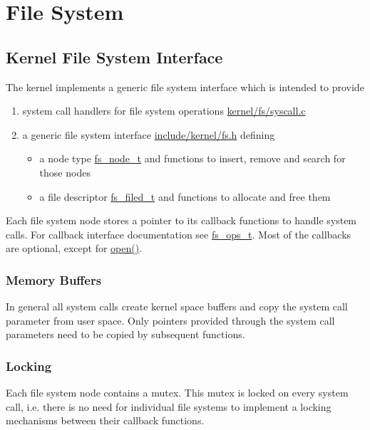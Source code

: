 %
%
%



\section{File System}
	\subsection{Kernel File System Interface}
		The kernel implements a generic file system interface which is intended to provide
		\begin{enumerate}
			\item system call handlers for file system operations \hyperref[kernel_2fs_2syscall_8c]{kernel/fs/syscall.c}
			\item a generic file system interface \hyperref[fs_8h]{include/kernel/fs.h} defining
				\begin{itemize}
					\item a node type \hyperref[structfs__node__t]{fs\_node\_t} and functions to insert, remove and search for those nodes
					\item a file descriptor \hyperref[structfs__filed__t]{fs\_filed\_t} and functions to allocate and free them
				\end{itemize}
		\end{enumerate}

		Each file system node stores a pointer to its callback functions to handle system calls. For callback interface documentation see \hyperref[structfs__ops__t]{fs\_ops\_t}. Most of the callbacks are optional, except for \hyperref[structfs__ops__t_a0ea05ccab180719ed0f32631d5ad71bf]{open()}.

		\subsubsection{Memory Buffers}
			In general all system calls create kernel space buffers and copy the system call parameter from user space. Only pointers provided through the system call parameters need to be copied by subsequent functions.

		\subsubsection{Locking}
			Each file system node contains a mutex. This mutex is locked on every system call, i.e. there is no need for individual file systems to implement a locking mechanisms between their callback functions.

